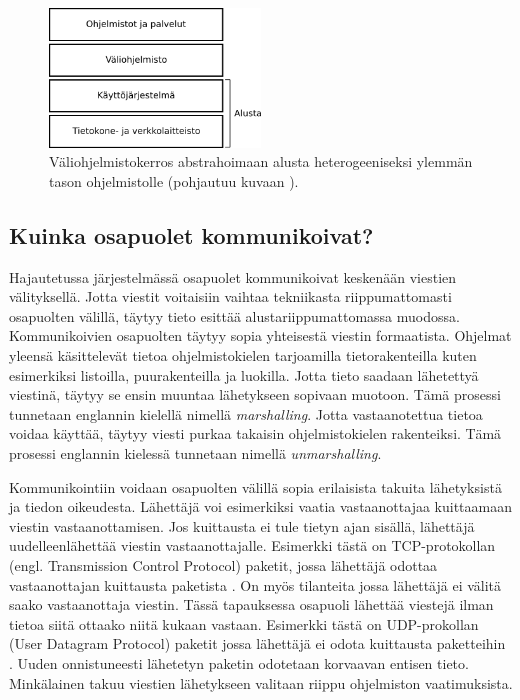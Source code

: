 \begin{figure}[ht!]
	\includegraphics[width=0.5\textwidth]{pictures/middleware-architecture.png}
	\caption{Väliohjelmistokerros abstrahoimaan alusta heterogeeniseksi ylemmän tason ohjelmistolle (pohjautuu kuvaan \mbox{\cite[s.~52]{distributed-systems-concepts-and-design}}).}
	\label{fig:middleware-architecture}
\end{figure}


\subsection{Kuinka osapuolet kommunikoivat?}
Hajautetussa järjestelmässä osapuolet kommunikoivat keskenään viestien välityksellä. Jotta viestit voitaisiin vaihtaa tekniikasta riippumattomasti osapuolten välillä, täytyy tieto esittää alustariippumattomassa muodossa. Kommunikoivien osapuolten täytyy sopia yhteisestä viestin formaatista. Ohjelmat yleensä käsittelevät tietoa ohjelmistokielen tarjoamilla tietorakenteilla kuten esimerkiksi listoilla, puurakenteilla ja luokilla. Jotta tieto saadaan lähetettyä viestinä, täytyy se ensin muuntaa lähetykseen sopivaan muotoon. Tämä prosessi tunnetaan englannin kielellä nimellä \emph{marshalling}. Jotta vastaanotettua tietoa voidaa käyttää, täytyy viesti purkaa takaisin ohjelmistokielen rakenteiksi. Tämä prosessi englannin kielessä tunnetaan nimellä \emph{unmarshalling}. \mbox{\cite[s.~158]{distributed-systems-concepts-and-design}}

Kommunikointiin voidaan osapuolten välillä sopia erilaisista takuita lähetyksistä ja tiedon oikeudesta. Lähettäjä voi esimerkiksi vaatia vastaanottajaa kuittaamaan viestin vastaanottamisen. Jos kuittausta ei tule tietyn ajan sisällä, lähettäjä uudelleenlähettää viestin vastaanottajalle. Esimerkki tästä on TCP-protokollan (engl. Transmission Control Protocol) paketit, jossa lähettäjä odottaa vastaanottajan kuittausta paketista \cite[s.~9--10]{tcp-standard}. On myös tilanteita jossa lähettäjä ei välitä saako vastaanottaja viestin. Tässä tapauksessa osapuoli lähettää viestejä ilman tietoa siitä ottaako niitä kukaan vastaan. Esimerkki tästä on UDP-prokollan (User Datagram Protocol) paketit jossa lähettäjä ei odota kuittausta paketteihin \cite{udp-standard}. Uuden onnistuneesti lähetetyn paketin odotetaan korvaavan entisen tieto. Minkälainen takuu viestien lähetykseen valitaan riippu ohjelmiston vaatimuksista.


